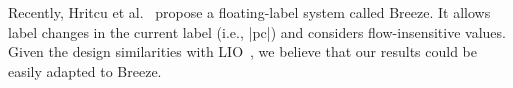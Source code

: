 


Recently, Hritcu et al.~\citep{10.1109/SP.2013.10} propose a floating-label
system called Breeze. It allows label changes in the current label (i.e., |pc|) and
considers flow-insensitive values. Given the design similarities with
LIO~\citep{stefan:lio}, we believe that our results could be easily adapted to
Breeze.

